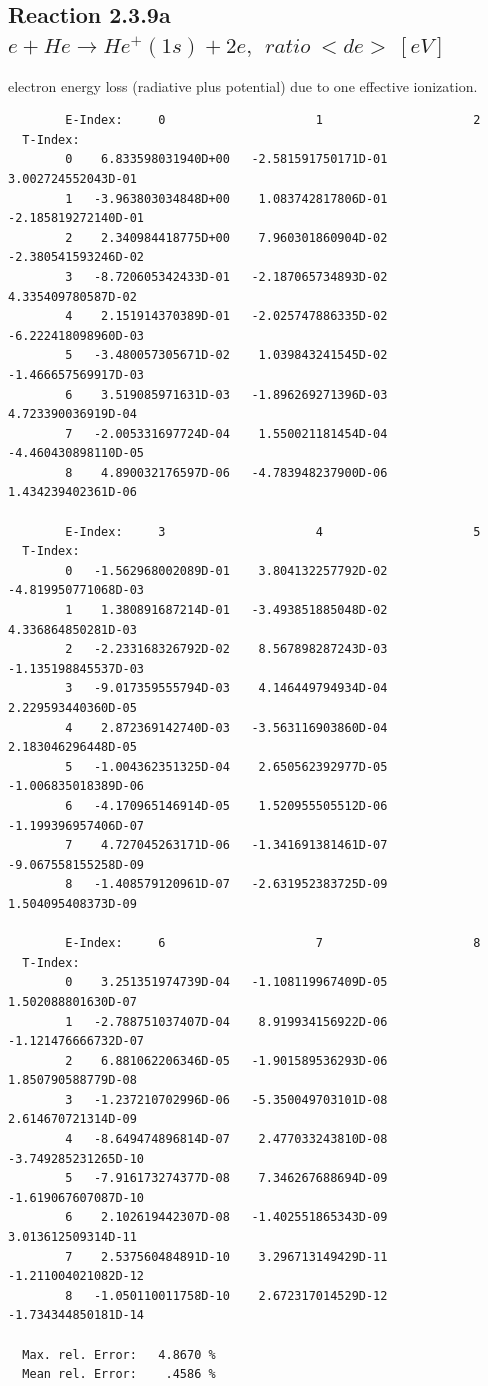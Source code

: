 \documentclass[12pt,dvips]{article}
\begin{document}
\subsection{
  Reaction 2.3.9a  $e + He \rightarrow He^+(1s) + 2e ,  \ \  ratio ~ <de> \ [eV] $
}

  electron energy loss (radiative plus potential) due to one effective ionization.

\begin{small}\begin{verbatim}
        E-Index:     0                     1                     2
  T-Index:
        0    6.833598031940D+00   -2.581591750171D-01    3.002724552043D-01
        1   -3.963803034848D+00    1.083742817806D-01   -2.185819272140D-01
        2    2.340984418775D+00    7.960301860904D-02   -2.380541593246D-02
        3   -8.720605342433D-01   -2.187065734893D-02    4.335409780587D-02
        4    2.151914370389D-01   -2.025747886335D-02   -6.222418098960D-03
        5   -3.480057305671D-02    1.039843241545D-02   -1.466657569917D-03
        6    3.519085971631D-03   -1.896269271396D-03    4.723390036919D-04
        7   -2.005331697724D-04    1.550021181454D-04   -4.460430898110D-05
        8    4.890032176597D-06   -4.783948237900D-06    1.434239402361D-06

        E-Index:     3                     4                     5
  T-Index:
        0   -1.562968002089D-01    3.804132257792D-02   -4.819950771068D-03
        1    1.380891687214D-01   -3.493851885048D-02    4.336864850281D-03
        2   -2.233168326792D-02    8.567898287243D-03   -1.135198845537D-03
        3   -9.017359555794D-03    4.146449794934D-04    2.229593440360D-05
        4    2.872369142740D-03   -3.563116903860D-04    2.183046296448D-05
        5   -1.004362351325D-04    2.650562392977D-05   -1.006835018389D-06
        6   -4.170965146914D-05    1.520955505512D-06   -1.199396957406D-07
        7    4.727045263171D-06   -1.341691381461D-07   -9.067558155258D-09
        8   -1.408579120961D-07   -2.631952383725D-09    1.504095408373D-09

        E-Index:     6                     7                     8
  T-Index:
        0    3.251351974739D-04   -1.108119967409D-05    1.502088801630D-07
        1   -2.788751037407D-04    8.919934156922D-06   -1.121476666732D-07
        2    6.881062206346D-05   -1.901589536293D-06    1.850790588779D-08
        3   -1.237210702996D-06   -5.350049703101D-08    2.614670721314D-09
        4   -8.649474896814D-07    2.477033243810D-08   -3.749285231265D-10
        5   -7.916173274377D-08    7.346267688694D-09   -1.619067607087D-10
        6    2.102619442307D-08   -1.402551865343D-09    3.013612509314D-11
        7    2.537560484891D-10    3.296713149429D-11   -1.211004021082D-12
        8   -1.050110011758D-10    2.672317014529D-12   -1.734344850181D-14

  Max. rel. Error:   4.8670 %
  Mean rel. Error:    .4586 %

\end{verbatim}\end{small}
\end{document}
